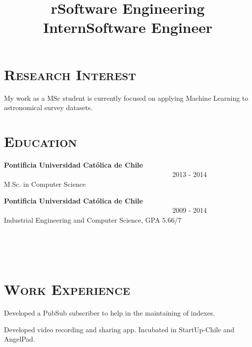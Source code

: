 \begin{resume}




\section{\textsc{Research Interest}}
My work as a MSc student is currently focused on applying Machine Learning to astronomical survey datasets.

\section{\textsc{Education}}

\textbf{Pontificia Universidad Cat\'olica de Chile} \ \ \ \ \ \ \ \ \ \ \ \ \ \ \ \ \ \ \ \ \ \ \ \ \ \ \ \ \ \ \ \ \ \ \ \ \ \ \ \ \ \ \ \ \ \ \ \ \ 2013 - 2014 \\
M.Sc. in Computer Science

\textbf{Pontificia Universidad Cat\'olica de Chile} \ \ \ \ \ \ \ \ \ \ \ \ \ \ \ \ \ \ \ \ \ \ \ \ \ \ \ \ \ \ \ \ \ \ \ \ \ \ \ \ \ \ \ \ \ \ \ \ \ 2009 - 2014 \\ 
Industrial Engineering and Computer Science, GPA 5.66/7



\begin{formatb}
  \title{r}\\
  \\
  \body\\
\end{formatb}

\section{\textsc{Work Experience}}

\title{Software Engineering Intern}
\begin{position}
Developed a PubSub subscriber to help in the maintaining of indexes.
\end{position}

\title{Software Engineer}
\begin{position}
Developed video recording and sharing app. Incubated in StartUp-Chile and AngelPad.
\end{position}


\end{resume}
